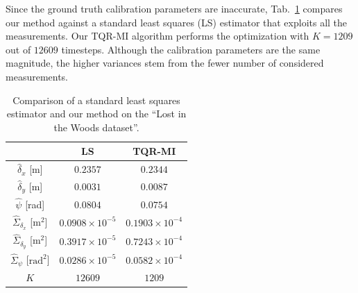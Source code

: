 Since the ground truth calibration parameters are inaccurate,
Tab.~\ref{tab:dataset2-comp} compares our method against a standard
least squares (LS) estimator that exploits all the measurements. Our TQR-MI
algorithm performs the optimization with $K=1209$ out of $12609$ timesteps.
Although the calibration parameters are the same magnitude, the higher variances
stem from the fewer number of considered measurements.

\begin{table}[!t]
\renewcommand{\arraystretch}{1.3}
\caption{Comparison of a standard least squares estimator and our
  method on the ``Lost in the Woods dataset''.}
\label{tab:dataset2-comp}
\centering
\begin{tabular}{c||c||c}
\hline
& \bfseries LS & \bfseries TQR-MI\\
\hline\hline
$\hat{\delta}_x$ [m] & $0.2357$ & $0.2344$\\
\hline
$\hat{\delta}_y$ [m]& $0.0031$ & $0.0087$\\
\hline
$\hat{\psi}$ [rad] & $0.0804$ & $0.0754$\\
\hline
$\hat{\Sigma}_{\delta_x}$ [$\text{m}^2$] & $0.0908\times 10^{-5}$ &
  $0.1903\times 10^{-4}$\\
\hline
$\hat{\Sigma}_{\delta_y}$ [$\text{m}^2$] & $0.3917\times 10^{-5}$ &
  $0.7243\times 10^{-4}$\\
\hline
$\hat{\Sigma}_{\psi}$ [$\text{rad}^2$] & $0.0286\times 10^{-5}$ &
  $0.0582\times 10^{-4}$\\
\hline
$K$ & $12609$ & $1209$\\
\hline
\end{tabular}
\end{table}
